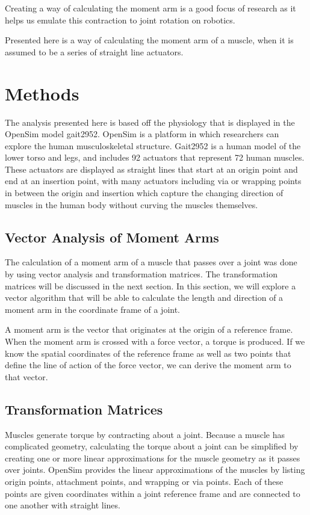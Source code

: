\documentclass[runningheads]{llncs}
\begin{document}
Creating a way of calculating the moment arm is a good focus of research as it helps us emulate this contraction to joint rotation on robotics. 

Presented here is a way of calculating the moment arm of a muscle, when it is assumed to be a series of straight line actuators. 


\section{Methods}
\label{methods}
The analysis presented here is based off the physiology that is displayed in the OpenSim model gait2952. OpenSim is a platform in which researchers can explore the human musculoskeletal structure. Gait2952 is a human model of the lower torso and legs, and includes 92 actuators that represent 72 human muscles. These actuators are displayed as straight lines that start at an origin point and end at an insertion point, with many actuators including via or wrapping points in between the origin and insertion which capture the changing direction of muscles in the human body without curving the muscles themselves. 


\subsection{Vector Analysis of Moment Arms}
The calculation of a moment arm of a muscle that passes over a joint was done by using vector analysis and transformation matrices. The transformation matrices will be discussed in the next section. In this section, we will explore a vector algorithm that will be able to calculate the length and direction of a moment arm in the coordinate frame of a joint. 

A moment arm is the vector that originates at the origin of a reference frame. When the moment arm is crossed with a force vector, a torque is produced. If we know the spatial coordinates of the reference frame as well as two points that define the line of action of the force vector, we can derive the moment arm to that vector. 

\subsection{Transformation Matrices}
Muscles generate torque by contracting about a joint. Because a muscle has complicated geometry, calculating the torque about a joint can be simplified by creating one or more linear approximations for the muscle geometry as it passes over joints. OpenSim provides the linear approximations of the muscles by listing origin points, attachment points, and wrapping or via points. Each of these points are given coordinates within a joint reference frame and are connected to one another with straight lines.
\end{document}

